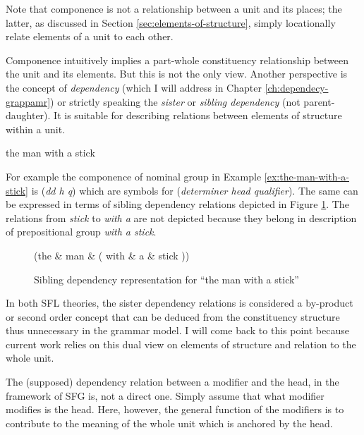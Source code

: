 Note that componence is not a relationship between a unit and its places; the latter, as discussed in Section \ref{sec:elements-of-structure}, simply locationally relate elements of a unit to each other.

Componence intuitively implies a part-whole constituency relationship between the unit and its elements. But this is not the only view. Another perspective is the concept of \textit{dependency} (which I will address in Chapter \ref{ch:dependecy-grappamr}) or strictly speaking the \textit{sister} or \textit{sibling dependency} (not parent-daughter). 
It is suitable for describing relations between elements of structure within a unit. 

\begin{exe}
    \ex\label{ex:the-man-with-a-stick} the man with a stick
\end{exe}

For example the componence of nominal group in Example \ref{ex:the-man-with-a-stick} is (\textit{dd h q}) which are symbols for (\textit{determiner head qualifier}). The same can be expressed in terms of sibling dependency relations depicted in Figure \ref{fig:dep-example-man-with-a-stick}. The relations from \textit{stick} to \textit{with a} are not depicted because they belong in description of prepositional group \textit{with a stick}.

\begin{figure}[!ht]
    \centering
    \begin{dependency}
        \begin{deptext}[column sep=1em]
            (the \& man \& ( with \& a \& stick )) \\
        \end{deptext}
    \end{dependency}
	\caption{Sibling dependency representation for ``the man with a stick''}
    \label{fig:dep-example-man-with-a-stick}
\end{figure}

In both SFL theories, the sister dependency relations is considered a by-product or second order concept that can be deduced from the constituency structure thus unnecessary in the grammar model. I will come back to this point because current work relies on this dual view on elements of structure and relation to the whole unit. 

The (supposed) dependency relation between a modifier and the head, in the framework of SFG is, not a direct one. 
Simply assume that what modifier modifies is the head. Here, however, the general function of the modifiers is to contribute to the meaning of the whole unit which is anchored by the head. 

